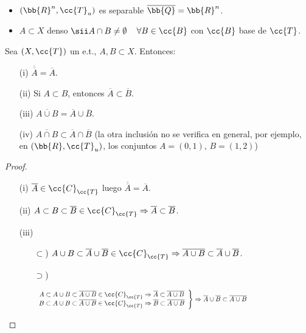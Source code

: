 \begin{ejemplo}\
    \begin{itemize}
        \item $(\bb{R}^n, \cc{T}_u)$ es separable $\overline{\bb{Q}}=\bb{R}^n$.
        \item $A\subset X$ denso $\sii A\cap B\neq \emptyset$\ \ $\forall B \in \cc{B}$ con $\cc{B}$ base de $\cc{T}$.
    \end{itemize}
\end{ejemplo}

\begin{prop}
    Sea $(X, \cc{T})$ un e.t., $A,B\subset X$. Entonces:
    \begin{enumerate}
        \item[(i)] $\overline{\overline{A}} = \overline{A}$.
        \item[(ii)] Si $A\subset B$, entonces $\overline{A}\subset \overline{B}$.
        \item[(iii)] $\overline{A\cup B} = \overline{A}\cup \overline{B}$.
        \item[(iv)] $\overline{A\cap B} \subset \overline{A}\cap \overline{B}$ (la otra inclusión no se verifica en general, por ejemplo, en $(\bb{R}, \cc{T}_u)$, los conjuntos $A=(0,1)$, $B=(1,2)$) 
    \end{enumerate}

    \begin{proof}\
        \begin{enumerate}
            \item[(i)] $\overline{A}\in \cc{C}_{\cc{T}}$ luego $\overline{\overline{A}} = \overline{A}$.
            \item[(ii)] $A\subset B \subset \overline{B}\in \cc{C}_{\cc{T}}\Rightarrow \overline{A}\subset \overline{B}$.
            \item[(iii)] 
            \begin{itemize}
                \item[$\subset$)] $A\cup B \subset \overline{A}\cup \overline{B}\in \cc{C}_{\cc{T}}\Rightarrow \overline{A\cup B}\subset \overline{A}\cup \overline{B}$.
                \item[$\supset$)]\ \\
                \vspace{-2cm}
                
                \begin{gather*}
                    \left.
                    \begin{array}{c}
                        A\subset A\cup B \subset \overline{A\cup B}\in \cc{C}_{\cc{T}} \Rightarrow \overline{A}\subset\overline{A\cup B} \\
                        B\subset A\cup B \subset \overline{A\cup B}\in \cc{C}_{\cc{T}} \Rightarrow \overline{B}\subset\overline{A\cup B}
                    \end{array}\right\} \Rightarrow \overline{A}\cup \overline{B}\subset \overline{A\cup B} \hspace*{5cm}
                \end{gather*}


\end{itemize}
\end{enumerate}
\end{proof}
\end{prop}
